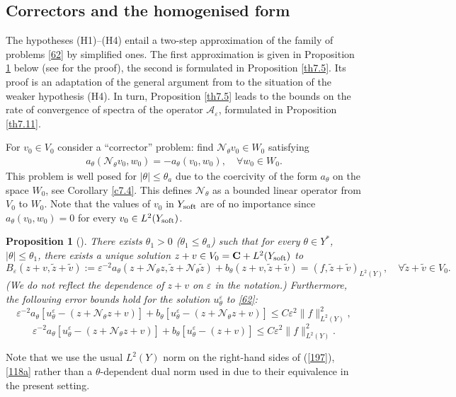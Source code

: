 \documentclass[11pt]{article}
\newcommand\e {\varepsilon}
\newcommand\soft{{\rm soft}}
\def\C{\mathbf {C}}
\def\AA{\mathcal{A}}
\newcommand{\eq}[1]{(\ref{#1})}
\newtheorem{proposition}[theorem]{Proposition}
\theoremstyle{remark}
\begin{document}
\subsection{Correctors and the homogenised form}

The hypotheses (H1)--(H4) entail a two-step approximation of the family of problems \eqref{62} by simplified ones. The first approximation  is given in Proposition \ref{th9.1} below (see \cite{CKS2023} for the proof), the second  is formulated in Proposition \ref{th7.5}. Its proof is an adaptation of the general argument from \cite{CKS2023} to the situation of the weaker hypothesis (H4). In  turn, Proposition \ref{th7.5} leads to the bounds on the rate of convergence of spectra of the operator $\AA_\e$, formulated in Proposition \ref{th7.11}.


For $v_0 \in V_0$ consider a ``corrector'' problem: find $\mathcal N_\theta v_0 \in W_0$ satisfying
\begin{equation*}%
	\begin{aligned}
	a_\theta(\mathcal N_\theta v_0 , w_0  ) =  - a_\theta(v_0 , w_0  ),\quad \forall w_0 \in W_0.
	\end{aligned}
\end{equation*}
This problem is well posed for $|\theta|\leq \theta_a$ due to the coercivity of the form $a_\theta$ on the space $W_0$, see Corollary \ref{c7.4}. This defines $\mathcal N_\theta$ as a bounded linear operator from $V_0$ to $W_0$.
Note that the values of $v_0$ in $Y_\soft$ are of no importance since  $a_\theta(v_0 , w_0 ) = 0$ for every $v_0 \in L^2(Y_\soft)$.


\begin{proposition}[{\cite[Theorem 5.3]{CKS2023}}]\label{th9.1}
 There exists $\theta_1>0$ ($\theta_1\leq \theta_a$) such that for every $\theta\in Y^*$, $|\theta|\leq \theta_1$, there exists a unique solution $z+ v\in V_0 =  \C +L^2(Y_\soft)$ to
	\begin{equation}\label{116}
		B_\e(z+ v, \widetilde z+ \tilde v) :=\e^{-2} a_\theta(z+ \mathcal N_\theta z, \widetilde z + \mathcal N_\theta \widetilde z) + b_\theta(z+v, \widetilde z+ \tilde v) = ( f, \widetilde z+ \tilde v)_{L^2(Y)}, \quad \forall \widetilde z+ \tilde v \in V_0.
	\end{equation}
	(We do not reflect the dependence of $z+v$ on $\e$ in the notation.)
	Furthermore, the following error bounds hold for	
	the solution $u^\e_\theta$ to \eqref{62}:
	\begin{equation}\label{197}
		\e^{-2}  a_\theta[u^\e_\theta - (z+ \mathcal N_\theta z + v )] + b_\theta[u^\e_\theta - (z+ \mathcal N_\theta z + v )] \leq C \e^2 \|f\|^2_{L^2(Y)},
	\end{equation}
	\begin{equation}\label{118a}
		\e^{-2}  a_\theta[u^\e_\theta - (z+ \mathcal N_\theta z + v )] + b_\theta[u^\e_\theta - (z+v)] \leq C \e^2 \|f\|^2_{L^2(Y)}.
	\end{equation}
\end{proposition}
Note that we use the usual $L^2(Y)$ norm on the right-hand  sides of \eq{197}, \eqref{118a} rather than  a $\theta$-dependent dual norm used in \cite{CKS2023} due to their equivalence in the present setting.
\end{document}

